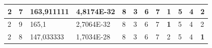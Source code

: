 \documentclass[conference]{IEEEtran}
\begin{document}
\begin{table}[]
\begin{tabular}{|llll|llllllll|}
\multicolumn{1}{|l|}{2}                                                     & \multicolumn{1}{l|}{7}                                                        & \multicolumn{1}{l|}{163,911111}                                                   & 4,8174E-32                     & \multicolumn{1}{l|}{8}                                                  & \multicolumn{1}{l|}{3}                                                  & \multicolumn{1}{l|}{6}                                                  & \multicolumn{1}{l|}{7}                                                  & \multicolumn{1}{l|}{\textbf{1}}                                         & \multicolumn{1}{l|}{5}                                                  & \multicolumn{1}{l|}{4}                                                  & 2                          \\ \hline
\multicolumn{1}{|l|}{2}                                                     & \multicolumn{1}{l|}{9}                                                        & \multicolumn{1}{l|}{165,1}                                                        & 2,7064E-32                     & \multicolumn{1}{l|}{8}                                                  & \multicolumn{1}{l|}{3}                                                  & \multicolumn{1}{l|}{6}                                                  & \multicolumn{1}{l|}{7}                                                  & \multicolumn{1}{l|}{\textbf{1}}                                         & \multicolumn{1}{l|}{5}                                                  & \multicolumn{1}{l|}{4}                                                  & 2                          \\ \hline
\multicolumn{1}{|l|}{2}                                                     & \multicolumn{1}{l|}{8}                                                        & \multicolumn{1}{l|}{147,033333}                                                   & 1,7034E-28                     & \multicolumn{1}{l|}{8}                                                  & \multicolumn{1}{l|}{3}                                                  & \multicolumn{1}{l|}{6}                                                  & \multicolumn{1}{l|}{7}                                                  & \multicolumn{1}{l|}{2}                                                  & \multicolumn{1}{l|}{5}                                                  & \multicolumn{1}{l|}{4}                                                  & \textbf{1}                 \\ \hline

\end{tabular}
\end{table}
\end{document}
